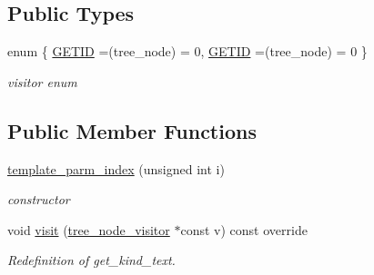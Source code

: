 \subsection*{Public Types}
\begin{DoxyCompactItemize}
\item 
enum \{ \hyperlink{structtemplate__parm__index_abc1454ed1a6bfd29adbb7409d7324989a036c6ee3baba8512fe08cd5d540e7e53}{G\+E\+T\+ID} =(tree\+\_\+node) = 0, 
\hyperlink{structtemplate__parm__index_abc1454ed1a6bfd29adbb7409d7324989a036c6ee3baba8512fe08cd5d540e7e53}{G\+E\+T\+ID} =(tree\+\_\+node) = 0
 \}\begin{DoxyCompactList}\small\item\em visitor enum \end{DoxyCompactList}
\end{DoxyCompactItemize}
\subsection*{Public Member Functions}
\begin{DoxyCompactItemize}
\item 
\hyperlink{structtemplate__parm__index_afc56a09613dd81de0e3404c4635e2711}{template\+\_\+parm\+\_\+index} (unsigned int i)
\begin{DoxyCompactList}\small\item\em constructor \end{DoxyCompactList}\item 
void \hyperlink{structtemplate__parm__index_a93264afe632fd02f7c454a429036064e}{visit} (\hyperlink{classtree__node__visitor}{tree\+\_\+node\+\_\+visitor} $\ast$const v) const override
\begin{DoxyCompactList}\small\item\em Redefinition of get\+\_\+kind\+\_\+text. \end{DoxyCompactList}\end{DoxyCompactItemize}
